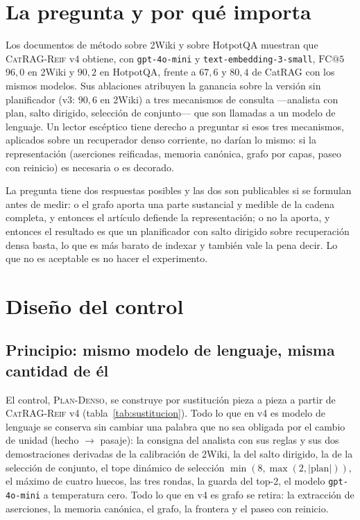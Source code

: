 \documentclass[11pt,a4paper]{article}
\newcommand{\sys}{\textsc{CatRAG-Reif}}
\newcommand{\gl}{\guillemotleft}
\newcommand{\gr}{\guillemotright}
\newcommand{\ctrl}{\textsc{Plan-Denso}}
\begin{document}
\section{La pregunta y por qué importa}
\label{sec:pregunta}

Los documentos de método sobre 2Wiki y sobre HotpotQA muestran que \sys{}
v4 obtiene, con \texttt{gpt-4o-mini} y \texttt{text-embedding-3-small},
$\mathrm{FC@}5$ $96{,}0$ en 2Wiki y $90{,}2$ en HotpotQA, frente a $67{,}6$
y $80{,}4$ de CatRAG con los mismos modelos. Sus ablaciones atribuyen la
ganancia sobre la versión sin planificador (v3: $90{,}6$ en 2Wiki) a tres
mecanismos de consulta ---analista con plan, salto dirigido, selección de
conjunto--- que son llamadas a un modelo de lenguaje. Un lector escéptico
tiene derecho a preguntar si esos tres mecanismos, aplicados sobre un
recuperador denso corriente, no darían lo mismo: si la representación
(aserciones reificadas, memoria canónica, grafo por capas, paseo con
reinicio) es necesaria o es decorado.

La pregunta tiene dos respuestas posibles y las dos son publicables si se
formulan antes de medir: o el grafo aporta una parte sustancial y medible de
la cadena completa, y entonces el artículo defiende la representación; o no
la aporta, y entonces el resultado es que un planificador con salto
dirigido sobre recuperación densa basta, lo que es más barato de indexar y
también vale la pena decir. Lo que no es aceptable es no hacer el
experimento.

\section{Diseño del control}
\label{sec:diseno}

\subsection{Principio: mismo modelo de lenguaje, misma cantidad de él}

El control, \ctrl{}, se construye por sustitución pieza a pieza a partir de
\sys{} v4 (tabla~\ref{tab:sustitucion}). Todo lo que en v4 es modelo de
lenguaje se conserva sin cambiar una palabra que no sea obligada por el
cambio de unidad (\gl{}hecho\gr{} $\to$ \gl{}pasaje\gr{}): la consigna del
analista con sus reglas y sus dos demostraciones derivadas de la
calibración de 2Wiki, la del salto dirigido, la de la selección de
conjunto, el tope dinámico de selección $\min(8,\max(2,|\text{plan}|))$, el
máximo de cuatro huecos, las tres rondas, la guarda del top-2, el modelo
\texttt{gpt-4o-mini} a temperatura cero. Todo lo que en v4 es grafo se
retira: la extracción de aserciones, la memoria canónica, el grafo, la
frontera y el paseo con reinicio.
\end{document}
